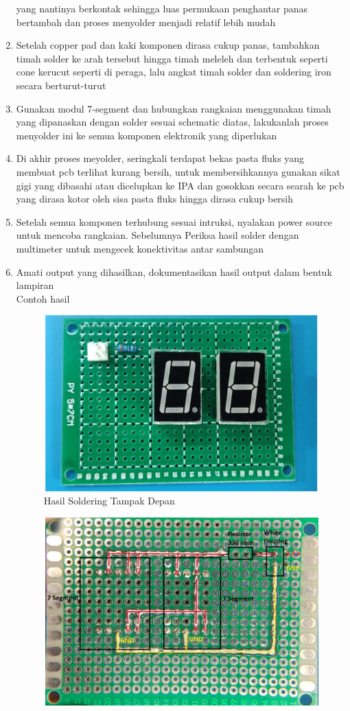\begin{enumerate}
    yang nantinya berkontak sehingga luas permukaan penghantar panas bertambah dan proses menyolder menjadi relatif lebih mudah
    \item Setelah copper pad dan kaki komponen dirasa cukup panas, tambahkan timah solder ke arah tersebut hingga timah meleleh dan terbentuk seperti cone kerucut seperti di peraga, lalu angkat timah solder dan soldering iron secara berturut-turut
    \item Gunakan modul 7-segment dan hubungkan rangkaian menggunakan timah yang dipanaskan dengan solder sesuai schematic diatas, lakukanlah proses menyolder ini ke semua komponen elektronik yang diperlukan
    \item Di akhir proses meyolder, seringkali terdapat bekas pasta fluks yang membuat pcb terlihat kurang bersih, untuk membersihkannya gunakan sikat gigi yang dibasahi atau dicelupkan ke IPA dan gosokkan secara searah ke pcb yang dirasa kotor oleh sisa pasta fluks hingga dirasa cukup bersih
    \item Setelah semua komponen terhubung sesuai intruksi, nyalakan power source untuk mencoba rangkaian. Sebelumnya Periksa hasil solder dengan multimeter untuk mengecek konektivitas antar sambungan
    \item Amati output yang dihasilkan, dokumentasikan hasil output dalam bentuk lampiran
        \\ Contoh hasil
        \begin{figure}[H]
            \centering
            \includegraphics[width=0.8\linewidth]{P1/img/contohhasil1.png}
            \caption{Hasil Soldering Tampak Depan}
            \label{fig:HasilTampakDepan}
        \end{figure}
        \begin{figure}[H]
            \centering
            \includegraphics[width=0.8\linewidth]{P1/img/contohhasil2.png}

\end{figure}
\end{enumerate}
